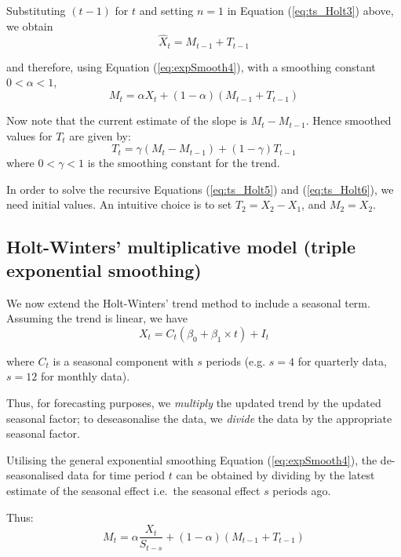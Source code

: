\documentclass[12pt,a4paper,openany,twoside]{report}
\renewcommand{\emph}[1]{\textcolor{Emerald}{\textit{#1}}}
\theoremstyle{definition}
\theoremstyle{remark}
\theoremstyle{plain}
\theoremstyle{definition}
\theoremstyle{definition}
\theoremstyle{definition}
\theoremstyle{remark}
\begin{document}
Substituting \((t - 1)\) for \(t\) and setting \(n = 1\) in Equation (\ref{eq:ts_Holt3}) above, we obtain
\[{\hat{X}}_{t} = M_{t - 1} + T_{t - 1}\]

and therefore, using Equation (\ref{eq:expSmooth4}), with a smoothing constant
\(0 < \alpha < 1\),
\begin{equation}
M_{t} = \alpha X_{t} + (1 - \alpha)(M_{t - 1} + T_{t - 1})
\label{eq:ts_Holt5}
\end{equation}

Now note that the current estimate of the slope is
\(M_{t} - M_{t - 1}\). Hence smoothed values for \(T_{t}\) are given
by:
\begin{equation}
T_{t} = \gamma\left( M_{t} - M_{t - 1} \right) + (1 - \gamma)T_{t - 1}
\label{eq:ts_Holt6}
\end{equation}
where \(0 < \gamma < 1\) is the smoothing constant for the trend.

In order to solve the recursive Equations (\ref{eq:ts_Holt5}) and (\ref{eq:ts_Holt6}), we need
initial values. An intuitive choice is to set \(T_{2} = X_{2} - X_{1}\),
and \(M_{2} = X_{2}.\)

\hypertarget{tes}{%
\subsection{Holt-Winters' multiplicative model (triple exponential smoothing)}\label{tes}}

We now extend the Holt-Winters' trend method to include a seasonal term.
Assuming the trend is linear, we have
\[X_{t} = C_{t}\left( \beta_{0} + \beta_{1}\times t \right) + I_{t}\]

where \(C_{t}\) is a seasonal component with \(s\) periods (e.g.
\(s = 4\) for quarterly data, \(s = 12\) for monthly data).

Thus, for forecasting purposes, we \emph{multiply} the updated trend by the updated
seasonal factor; to deseasonalise the data, we \emph{divide} the data by the
appropriate seasonal factor.

Utilising the general exponential smoothing Equation (\ref{eq:expSmooth4}), the
de-seasonalised data for time period \(t\) can be obtained by dividing by
the latest estimate of the seasonal effect i.e.~the seasonal effect
\(s\) periods ago.

Thus:
\begin{equation}
M_{t} = \alpha\frac{X_{t}}{S_{t - s}} + (1 - \alpha)(M_{t - 1} + T_{t - 1})
\label{eq:ts_HoltWint1}
\end{equation}
\end{document}
